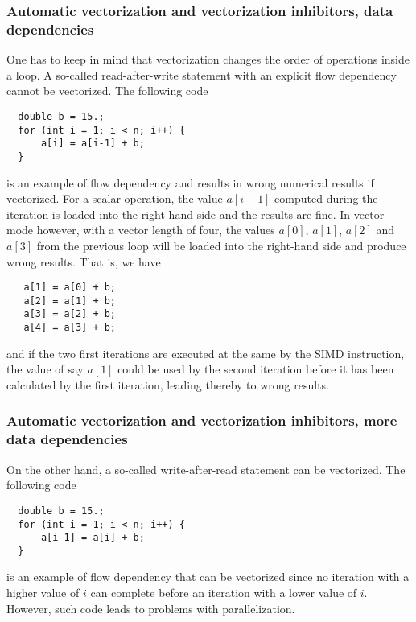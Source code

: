 \documentclass{beamer}
\begin{document}
\begin{frame}
\frametitle{Automatic vectorization and vectorization inhibitors, data dependencies}

One has to keep in mind that vectorization changes the order of operations inside a loop. A so-called
read-after-write statement with an explicit flow dependency cannot be vectorized. The following code





\begin{verbatim}
  double b = 15.;
  for (int i = 1; i < n; i++) {
      a[i] = a[i-1] + b;
  }

\end{verbatim}

is an example of flow dependency and results in wrong numerical results if vectorized. For a scalar operation, the value $a[i-1]$ computed during the iteration is loaded into the right-hand side and the results are fine. In vector mode however, with a vector length of four, the values $a[0]$, $a[1]$, $a[2]$ and $a[3]$ from the previous loop will be loaded into the right-hand side and produce wrong results. That is, we have





\begin{verbatim}
   a[1] = a[0] + b;
   a[2] = a[1] + b;
   a[3] = a[2] + b;
   a[4] = a[3] + b;

\end{verbatim}

and if the two first iterations are  executed at the same by the SIMD instruction, the value of say $a[1]$ could be used by the second iteration before it has been calculated by the first iteration, leading thereby to wrong results.
\end{frame}

\begin{frame}
\frametitle{Automatic vectorization and vectorization inhibitors, more data dependencies}

On the other hand,  a so-called 
write-after-read statement can be vectorized. The following code





\begin{verbatim}
  double b = 15.;
  for (int i = 1; i < n; i++) {
      a[i-1] = a[i] + b;
  }

\end{verbatim}

is an example of flow dependency that can be vectorized since no iteration with a higher value of $i$
can complete before an iteration with a lower value of $i$. However, such code leads to problems with parallelization.
\end{frame}
\end{document}
